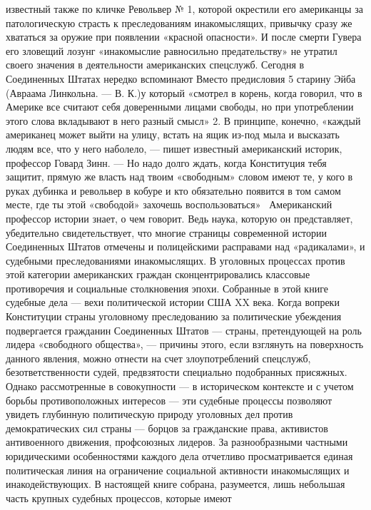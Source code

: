 \documentclass[12pt, a4paper, openany]{book}
\begin{document}
известный также по кличке Револьвер № 1, которой 
окрестили его американцы за патологическую страсть 
к преследованиям инакомыслящих, привычку сразу же 
хвататься за оружие при появлении «красной опасности». 
И после смерти Гувера его зловещий лозунг «инакомыслие 
равносильно предательству» не утратил своего значения 
в деятельности американских спецслужб. 
Сегодня в Соединенных Штатах нередко вспоминают 
Вместо предисловия 
5 
старину Эйба (Авраама Линкольна. — В. К.)у который 
«смотрел в корень, когда говорил, что в Америке все 
считают себя доверенными лицами свободы, но при 
употреблении этого слова вкладывают в него разный 
смысл» 2. В принципе, конечно, «каждый американец может 
выйти на улицу, встать на ящик из-под мыла и высказать 
людям все, что у него наболело, — пишет известный 
американский историк, профессор Говард Зинн. — Но надо 
долго ждать, когда Конституция тебя защитит, прямую же 
власть над твоим «свободным» словом имеют те, у кого 
в руках дубинка и револьвер в кобуре и кто обязательно 
появится в том самом месте, где ты этой «свободой» 
захочешь воспользоваться» \ 
Американский профессор истории знает, о чем говорит. 
Ведь наука, которую он представляет, убедительно  
свидетельствует, что многие страницы современной истории 
Соединенных Штатов отмечены и полицейскими  
расправами над «радикалами», и судебными преследованиями 
инакомыслящих. 
В уголовных процессах против этой категории  
американских граждан сконцентрировались классовые  
противоречия и социальные столкновения эпохи. Собранные в этой 
книге судебные дела — вехи политической истории США 
XX века. Когда вопреки Конституции страны уголовному 
преследованию за политические убеждения подвергается 
гражданин Соединенных Штатов — страны, претендующей 
на роль лидера «свободного общества», — причины этого, 
если взглянуть на поверхность данного явления, можно 
отнести на счет злоупотреблений спецслужб,  
безответственности судей, предвзятости специально подобранных 
присяжных. Однако рассмотренные в совокупности — 
в историческом контексте и с учетом борьбы  
противоположных интересов — эти судебные процессы позволяют 
увидеть глубинную политическую природу уголовных дел 
против демократических сил страны — борцов за  
гражданские права, активистов антивоенного движения,  
профсоюзных лидеров. За разнообразными частными юридическими 
особенностями каждого дела отчетливо просматривается 
единая политическая линия на ограничение социальной 
активности инакомыслящих и инакодействующих. 
В настоящей книге собрана, разумеется, лишь  
небольшая часть крупных судебных процессов, которые имеют 
\end{document}

